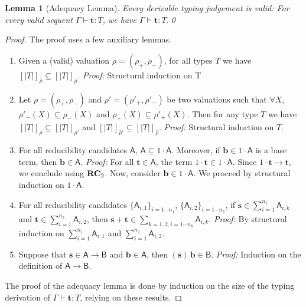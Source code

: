 \documentclass[colorlinks=true,linkcolor=black,urlcolor=black,citecolor=blue,submission,copyright,creativecommons]{eptcs}
\newtheorem{lemma}[theorem]{Lemma}
\newcommand{\ve}[1]{\mathrm{\textbf{#1}}}
\newcommand{\type}{\colon\!}
\newcommand{\RCn}{{\bf RC}}
\newcommand{\bcal}[1]{\mathsf{#1}}
\newcommand{\denot}[1]{{[\!|{#1}|\!]}}
\begin{document}
\begin{lemma}[Adequacy Lemma]\label{lem:SNadeq}
Every derivable typing judgement is valid: For every valid sequent $\Gamma\vdash\ve t:T$, we have $\Gamma\models\ve t:T$.\qed
\end{lemma}
\begin{proof}
 The proof uses a few auxiliary lemmas.
 \begin{enumerate}
  \item\label{lem:polar1}   Given a (valid) valuation $\rho=(\rho_+,\rho_-)$, for all types $T$ we have $\denot{T}_{\bar{\rho}}\subseteq\denot{T}_{\rho}$. 
  {\em Proof:} Structural induction on T
\item\label{lem:polar2} Let $\rho=(\rho_+,\rho_-)$ and $\rho'=(\rho'_+,\rho'_-)$ be two valuations such that $\forall X$, $\rho'_-(X)\subseteq\rho_-(X)$ and $\rho_+(X)\subseteq\rho'_+(X)$. Then for any type $T$ we have $\denot{T}_{\rho}\subseteq\denot{T}_{\rho'}$ and $\denot{T}_{\bar\rho'}\subseteq\denot{T}_{\bar\rho}$.
  {\em Proof:} Structural induction on $T$.
\item\label{lem:1cdotrc}
  For all reducibility candidates $\bcal A$, $\bcal A\subseteq 1\cdot
  \bcal A$. Moreover, if $\ve b\in1\cdot\bcal A$ is a base term, then
  $\ve b\in\bcal A$. 
  {\em Proof:} For all $\ve t\in\bcal A$, the term $1\cdot\ve t\in1\cdot\bcal A$. Since
  $1\cdot \ve t\to\ve t$, we conclude using $\RCn_2$.
  Now, consider $\ve b\in 1\cdot\bcal A$. We proceed by structural induction on $1\cdot\bcal A$.
\item\label{lem:sumrc}
  For all reducibility candidates $\{\bcal A_{i,1}\}_{i=1\cdots n_1}$,
  $\{\bcal A_{i,2}\}_{i=1\cdots n_2}$, if $\ve
  s\in\sum_{i=1}^{n_1}\bcal A_{i,k}$ and $\ve
  t\in\sum_{i=1}^{n_2}\bcal A_{i,2}$, then $\ve s+\ve t\in\sum_{k=1,2, i=1\cdots n_k}\bcal A_{i,k}$. 
  {\em Proof:} By structural induction on $\sum_{i=1}^{n_1}\bcal A_{i,1}$ and
  $\sum_{i=1}^{n_2}\bcal A_{i,2}$.
\item\label{lem:applirc}
  Suppose that $\ve s\in\bcal A\to\bcal B$ and $\ve b\in\bcal A$, then
  $(\ve s)\,\ve b\in\bcal B$. 
  {\em Proof:} Induction on the definition of $\bcal A\to\bcal B$.
 \end{enumerate}
 
 \noindent The proof of the adequacy lemma is done by induction on the size of
the typing derivation of $\Gamma\vdash\ve t\type T$, relying on these
results.
\end{proof}
\end{document}
